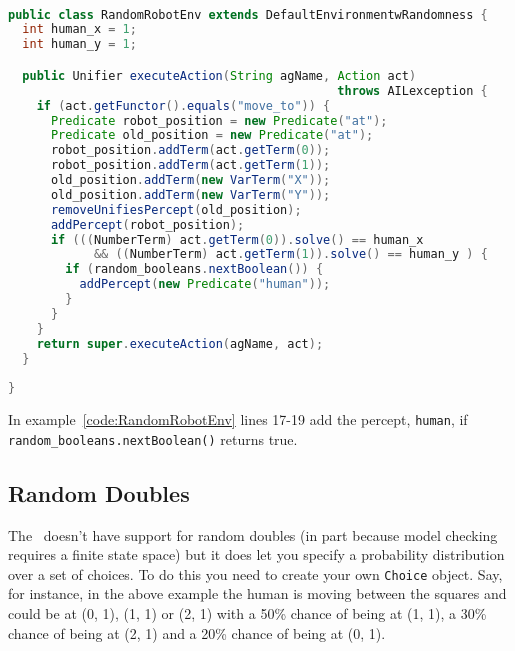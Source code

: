 \begin{ourexample}
\label{code:RandomRobotEnv} \quad \\
\begin{lstlisting}[basicstyle=\sffamily,language=Java,style=easslisting]
public class RandomRobotEnv extends DefaultEnvironmentwRandomness {
  int human_x = 1;
  int human_y = 1;

  public Unifier executeAction(String agName, Action act) 
                                              throws AILexception {
    if (act.getFunctor().equals("move_to")) {
      Predicate robot_position = new Predicate("at");
      Predicate old_position = new Predicate("at");
      robot_position.addTerm(act.getTerm(0));
      robot_position.addTerm(act.getTerm(1));
      old_position.addTerm(new VarTerm("X"));
      old_position.addTerm(new VarTerm("Y"));
      removeUnifiesPercept(old_position);
      addPercept(robot_position);
      if (((NumberTerm) act.getTerm(0)).solve() == human_x 
            && ((NumberTerm) act.getTerm(1)).solve() == human_y ) {
        if (random_booleans.nextBoolean()) {
          addPercept(new Predicate("human"));
        }
      }
    }
    return super.executeAction(agName, act);
  }
	      
}
\end{lstlisting}
\end{ourexample}

\begin{sloppypar}
In example~\ref{code:RandomRobotEnv} lines 17-19 add the percept, \lstinline{human}, if \texttt{random\_booleans.nextBoolean()} returns true.
\end{sloppypar}

\subsection{Random Doubles}
The \ail\ doesn't have support for random doubles (in part because model checking requires a finite state space) but it does let you specify a probability distribution over a set of choices.  To do this you need to create your own \texttt{Choice} object.  Say, for instance, in the above example the human is moving between the squares and could be at (0, 1), (1, 1) or (2, 1) with a 50\% chance of being at (1, 1), a 30\% chance of being at (2, 1) and a 20\% chance of being at (0, 1).


